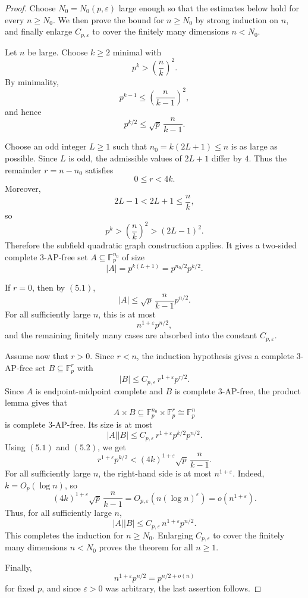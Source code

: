 \documentclass[11pt]{article}
\begin{document}
	\begin{proof}
		Choose \(N_0=N_0(p,\varepsilon)\) large enough so that the estimates below hold
		for every \(n\ge N_0\).  We then prove the bound for \(n\ge N_0\) by strong
		induction on \(n\), and finally enlarge \(C_{p,\varepsilon}\) to cover the
		finitely many dimensions \(n<N_0\).
		
		Let \(n\) be large.  Choose \(k\ge2\) minimal with
		\[
		p^k>\left(\frac nk\right)^2 .
		\]
		By minimality,
		\[
		p^{k-1}\le \left(\frac{n}{k-1}\right)^2,
		\]
		and hence
		\[
		p^{k/2}
		\le
		\sqrt p\,\frac{n}{k-1}.
		\tag{5.1}
		\]
		
		Choose an odd integer \(L\ge1\) such that
		$ n_0=k(2L+1)\le n$
		is as large as possible.  Since \(L\) is odd, the admissible values of
		\(2L+1\) differ by \(4\).  Thus the remainder
		$ r=n-n_0$
		satisfies
		\[
		0\le r<4k .
		\tag{5.2}
		\]
		Moreover,
		\[
		2L-1<2L+1\le \frac nk,
		\]
		so
		\[
		p^k>\left(\frac nk\right)^2>(2L-1)^2 .
		\]
		Therefore the subfield quadratic graph construction applies.  It gives a two-sided
		complete \(3\)-AP-free set $A\subseteq \mathbb F_p^{n_0}$
		of size
		\[
		|A|
		=
		p^{k(L+1)}
		=
		p^{n_0/2}p^{k/2}.
		\]
		
		If \(r=0\), then by \((5.1)\),
		\[
		|A|
		\le
		\sqrt p\,\frac{n}{k-1}p^{n/2}.
		\]
		For all sufficiently large \(n\), this is at most
		\[
		n^{1+\varepsilon}p^{n/2},
		\]
		and the remaining finitely many cases are absorbed into the constant
		\(C_{p,\varepsilon}\).
		
		Assume now that \(r>0\).  Since \(r<n\), the induction hypothesis gives a
		complete \(3\)-AP-free set
		$ B\subseteq \mathbb F_p^r$
		with
		\[
		|B|\le
		C_{p,\varepsilon}\,r^{1+\varepsilon}p^{r/2}.
		\]
		Since \(A\) is endpoint-midpoint complete  and \(B\) is complete \(3\)-AP-free, the
		product lemma gives that
		\[
		A\times B
		\subseteq
		\mathbb F_p^{n_0}\times\mathbb F_p^r
		\cong
		\mathbb F_p^n
		\]
		is complete \(3\)-AP-free.  Its size is at most
		\[
		|A||B|
		\le
		C_{p,\varepsilon}\,
		r^{1+\varepsilon}p^{k/2}p^{n/2}.
		\]
		Using \((5.1)\) and \((5.2)\), we get
		\[
		r^{1+\varepsilon}p^{k/2}
		<
		(4k)^{1+\varepsilon}
		\sqrt p\,\frac{n}{k-1}.
		\]
		For all sufficiently large \(n\), the right-hand side is at most
		$   n^{1+\varepsilon}.$
		Indeed, \(k=O_p(\log n)\), so
		\[
		(4k)^{1+\varepsilon}\sqrt p\,\frac{n}{k-1}
		=
		O_{p,\varepsilon}\!\left(n(\log n)^\varepsilon\right)
		=
		o\!\left(n^{1+\varepsilon}\right).
		\]
		Thus, for all sufficiently large \(n\),
		\[
		|A||B|
		\le
		C_{p,\varepsilon}\,n^{1+\varepsilon}p^{n/2}.
		\]
		This completes the induction for \(n\ge N_0\).  Enlarging
		\(C_{p,\varepsilon}\) to cover the finitely many dimensions \(n<N_0\) proves
		the theorem for all \(n\ge1\).
		
		Finally,
		\[
		n^{1+\varepsilon}p^{n/2}=p^{n/2+o(n)}
		\]
		for fixed \(p\), and since \(\varepsilon>0\) was arbitrary, the last assertion
		follows.
	\end{proof}
	
\end{document}
